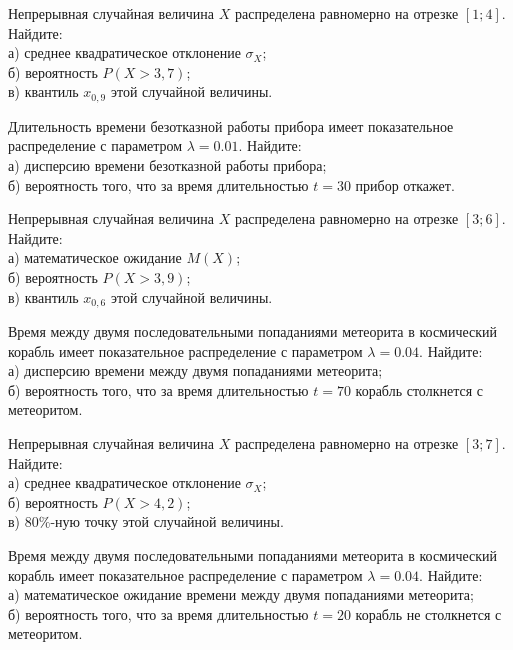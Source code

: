 \vfill

\newpage\setcounter{zad}{0}

\z Непрерывная случайная величина $X$ распределена равномерно на отрезке $[1; 4]$. Найдите: \\ \quad а) среднее квадратическое отклонение $\sigma_X$; \\ \quad б) вероятность $P(X>3{,}7)$; \\ \quad в) квантиль $x_{0{,}9}$ этой случайной величины.


\vfill

\z Длительность времени безотказной работы прибора имеет показательное распределение с параметром $\lambda = 0.01$. Найдите: \\ \quad а) дисперсию времени безотказной работы прибора; \\ \quad б) вероятность того, что за время длительностью $t = 30$ прибор  откажет.
 

\vfill

\newpage\setcounter{zad}{0}

\z Непрерывная случайная величина $X$ распределена равномерно на отрезке $[3; 6]$. Найдите: \\ \quad а) математическое ожидание $M(X)$; \\ \quad б) вероятность $P(X>3{,}9)$; \\ \quad в) квантиль $x_{0{,}6}$ этой случайной величины.


\vfill

\z Время между двумя последовательными попаданиями метеорита в космический корабль имеет показательное распределение с параметром $\lambda = 0.04$. Найдите: \\ \quad а) дисперсию времени между двумя попаданиями метеорита; \\ \quad б) вероятность того, что за время длительностью $t = 70$ корабль  столкнется с метеоритом.
 

\vfill

\newpage\setcounter{zad}{0}

\z Непрерывная случайная величина $X$ распределена равномерно на отрезке $[3; 7]$. Найдите: \\ \quad а) среднее квадратическое отклонение $\sigma_X$; \\ \quad б) вероятность $P(X>4{,}2)$; \\ \quad в) $80\%$-ную точку этой случайной величины.


\vfill

\z Время между двумя последовательными попаданиями метеорита в космический корабль имеет показательное распределение с параметром $\lambda = 0.04$. Найдите: \\ \quad а) математическое ожидание времени между двумя попаданиями метеорита; \\ \quad б) вероятность того, что за время длительностью $t = 20$ корабль не столкнется с метеоритом.
 

